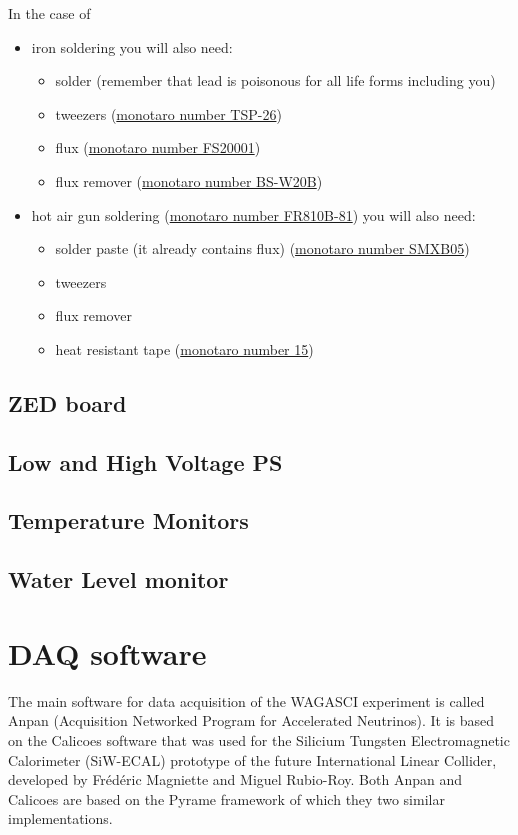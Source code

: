 In the case of
\begin{itemize}
\item iron soldering you will also need:
  \begin{itemize}
  \item solder (remember that lead is poisonous for all life forms including
    you)
  \item tweezers
    (\href{https://www.monotaro.com/p/0840/4873/?displayId=5}{monotaro number
      TSP-26})
  \item flux (\href{https://www.monotaro.com/p/3952/8833/?displayId=5}{monotaro
      number FS20001})
  \item flux remover
    (\href{https://www.monotaro.com/p/6215/1382/?displayId=5}{monotaro number
      BS-W20B})
  \end{itemize}
\item hot air gun soldering
  (\href{https://www.monotaro.com/p/4893/0954/?displayId=5}{monotaro number
    FR810B-81}) you will also need:
  \begin{itemize}
  \item solder paste (it already contains flux)
    (\href{https://www.monotaro.com/p/1001/3097/?displayId=5}{monotaro number
      SMXB05})
  \item tweezers
  \item flux remover
  \item heat resistant tape
    (\href{https://www.monotaro.com/p/5638/8526/?displayId=5}{monotaro number
      15})
  \end{itemize}
\end{itemize}

\section{ZED board}
\section{Low and High Voltage PS}
\section{Temperature Monitors}
\section{Water Level monitor}

\chapter{DAQ software}
The main software for data acquisition of the WAGASCI experiment is
called Anpan (Acquisition Networked Program for Accelerated
Neutrinos). It is based on the Calicoes software that was used for the
Silicium Tungsten Electromagnetic Calorimeter (SiW-ECAL) prototype of
the future International Linear Collider, developed by Frédéric
Magniette and Miguel Rubio-Roy. Both Anpan and Calicoes are based on
the Pyrame framework of which they two similar implementations.

